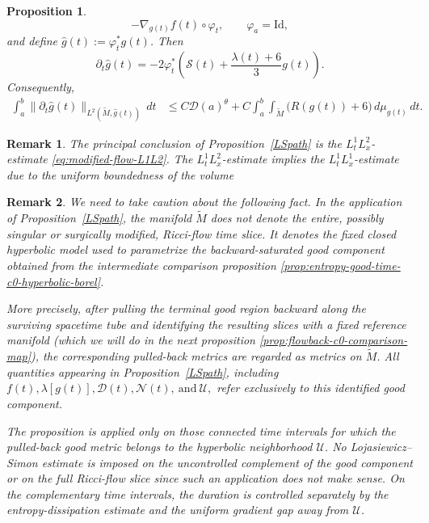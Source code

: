 \documentclass{amsart}
\newtheorem{remark}{Remark}
\newtheorem{proposition}{Proposition}[section]
\begin{document}
\begin{proposition}
\[        -\nabla_{g(t)}f(t)\circ\varphi_t,
        \qquad
        \varphi_a=\text{Id},
\]
and define $\widehat g(t):=\varphi_t^*g(t)$. Then
\begin{equation}
\label{eq:modified-Ricci-flow-evolution}
        \partial_t\widehat g(t)
        =
        -2\varphi_t^*
        \left(
        \mathcal S(t)
        +
        \frac{\lambda(t)+6}{3}g(t)
        \right).
\end{equation}
Consequently,
\begin{align}
        \int_a^b
        \|\partial_t\widehat g(t)\|
        _{L^2(\widetilde M,\widehat g(t))}
        \,dt
        &\leq
        C\mathcal D(a)^\theta
        +
        C
        \int_a^b
        \int_{\widetilde M}
        \bigl(R(g(t))+6\bigr)
        \,d\mu_{g(t)}\,dt.
\label{eq:modified-flow-L1L2}
\end{align}
\end{proposition}

\begin{remark}
\label{rem:L2-stronger-than-L1}
The principal conclusion of Proposition~\ref{LSpath} is the
\(L_t^1L_x^2\)-estimate
\eqref{eq:modified-flow-L1L2}. The \(L_t^1L_x^2\)-estimate implies the
\(L_t^1L_x^1\)-estimate due to the uniform boundedness of the volume
\end{remark}

\begin{remark}
\label{rem:LS-good-component-interpretation}
We need to take caution about the following fact. In the application of Proposition~\ref{LSpath}, the manifold
\(\widetilde M\) does not denote the entire, possibly singular or
surgically modified, Ricci-flow time slice. It denotes the fixed closed
hyperbolic model used to parametrize the backward-saturated good
component obtained from the intermediate comparison proposition \ref{prop:entropy-good-time-c0-hyperbolic-borel}.

\noindent More precisely, after pulling the terminal good region backward along
the surviving spacetime tube and identifying the resulting slices with
a fixed reference manifold (which we will do in the next proposition \ref{prop:flowback-c0-comparison-map}), the corresponding pulled-back metrics are
regarded as metrics on \(\widetilde M\). All quantities appearing in
Proposition~\ref{LSpath}, including
$f(t),    \lambda[g(t)],
        \mathcal D(t),
        \mathcal N(t),~
        \text{and}
        ~\mathcal U,
$
refer exclusively to this identified good component.

\noindent The proposition is applied only on those connected time intervals for
which the pulled-back good metric belongs to the hyperbolic
neighborhood \(\mathcal U\). No Lojasiewicz--Simon estimate is imposed
on the uncontrolled complement of the good component or on the full
Ricci-flow slice since such an application does not make sense. On the complementary time intervals, the duration is
controlled separately by the entropy-dissipation estimate and the
uniform gradient gap away from \(\mathcal U\).
\end{remark}
\end{document}
